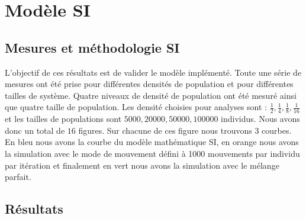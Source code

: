 \chapter{Modèle SI} \label{ch:SI}

\section{Mesures et méthodologie SI}

L'objectif de ces résultats est de valider le modèle implémenté. Toute une série de mesures ont été prise pour différentes densités de population et pour différentes tailles de système. Quatre niveaux de densité de population ont été mesuré ainsi que quatre taille de population. Les densité choisies pour analyses sont : $\frac{1}{2},\frac{1}{4},\frac{1}{8},\frac{1}{16}$ et les tailles de populations sont $5000,20000,50000,100000$ individus. Nous avons donc un total de $16$ figures. Sur chacune de ces figure nous trouvons $3$ courbes. En bleu nous avons la courbe du modèle mathématique SI, en orange nous avons la simulation avec le mode de mouvement défini à 1000 mouvements par individu par itération et finalement en vert nous avons la simulation avec le mélange parfait.

\newpage

\section{Résultats}

